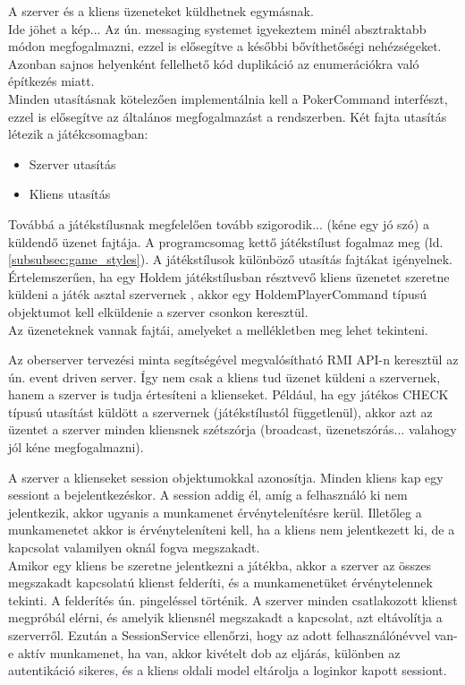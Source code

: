 A szerver és a kliens  üzeneteket küldhetnek egymásnak. \\
Ide jöhet a kép... Az ún. messaging systemet igyekeztem minél absztraktabb módon megfogalmazni, ezzel is elősegítve a későbbi bővíthetőségi nehézségeket. Azonban sajnos helyenként fellelhető kód duplikáció az enumerációkra való építkezés miatt. \\
Minden utasításnak kötelezően implementálnia kell a PokerCommand interfészt, ezzel is elősegítve az általános megfogalmazást a rendszerben. Két fajta utasítás létezik a játékcsomagban:
\begin{itemize}[leftmargin=2cm]
	\item Szerver utasítás
	\item Kliens utasítás
\end{itemize}
Továbbá a játékstílusnak megfelelően tovább szigorodik... (kéne egy jó szó) a küldendő üzenet fajtája. A programcsomag kettő játékstílust fogalmaz meg (ld. \ref{subsubsec:game_styles}). A játékstílusok különböző utasítás fajtákat igényelnek. Értelemszerűen, ha egy Holdem játékstílusban résztvevő kliens üzenetet szeretne küldeni a játék asztal szervernek , akkor egy HoldemPlayerCommand típusú objektumot kell elküldenie a szerver csonkon keresztül. \\
Az üzeneteknek vannak fajtái, amelyeket a mellékletben meg lehet tekinteni.

Az oberserver tervezési minta segítségével megvalósítható RMI API-n keresztül az ún. event driven server. Így nem csak a kliens tud üzenet küldeni a szervernek, hanem a szerver is tudja értesíteni a klienseket. Például, ha egy játékos CHECK típusú utasítást küldött a szervernek (játékstílustól függetlenül), akkor azt az üzentet a szerver minden kliensnek szétszórja (broadcast, üzenetszórás... valahogy jól kéne megfogalmazni).

A szerver a klienseket session objektumokkal azonosítja. Minden kliens kap egy sessiont a bejelentkezéskor. A session addig él, amíg a felhasználó ki nem jelentkezik, akkor ugyanis a munkamenet érvénytelenítésre kerül. Illetőleg a munkamenetet akkor is érvényteleníteni kell, ha a kliens nem jelentkezett ki, de a kapcsolat valamilyen oknál fogva megszakadt. \\
Amikor egy kliens be szeretne jelentkezni a játékba, akkor a szerver az összes megszakadt kapcsolatú klienst felderíti, és a munkamenetüket érvénytelennek tekinti. A felderítés ún. pingeléssel történik. A szerver minden csatlakozott klienst megpróbál elérni, és amelyik kliensnél megszakadt a kapcsolat, azt eltávolítja a szerverről. Ezután a SessionService ellenőrzi, hogy az adott felhasználónévvel van-e aktív munkamenet, ha van, akkor kivételt dob az eljárás, különben az autentikáció sikeres, és a kliens oldali model eltárolja a loginkor kapott sessiont.

